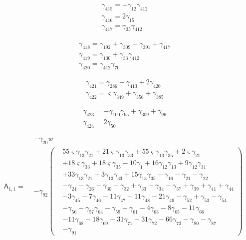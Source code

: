 \[\begin{aligned}\gamma_{415}=- \gamma_{12} \gamma_{412}\\ \gamma_{416}=2 \gamma_{15}\\ \gamma_{417}=\gamma_{35} \gamma_{412}\end{aligned}\]

\[\begin{aligned}\gamma_{418}=\gamma_{192} + \gamma_{309} + \gamma_{391} + \gamma_{417}\\ \gamma_{419}=\gamma_{130} + \gamma_{33} \gamma_{412}\\ \gamma_{420}=\gamma_{412} \gamma_{70}\end{aligned}\]

\[\begin{aligned}\gamma_{421}=\gamma_{286} + \gamma_{413} + 2 \gamma_{420}\\ \gamma_{422}=\varsigma  \gamma_{349} + \gamma_{356} + \gamma_{385}\end{aligned}\]

\[\begin{aligned}\gamma_{423}=- \gamma_{100} \gamma_{95} + \gamma_{309} + \gamma_{96}\\ \gamma_{424}=2 \gamma_{50}\end{aligned}\]

\[\mathsf A_{1,1}=\begin{aligned}&- \gamma_{20} w\\&- \gamma_{92} \left(\begin{aligned}& 55 \varsigma  \gamma_{13} \gamma_{21}+ 21 \varsigma  \gamma_{13} \gamma_{33}+ 55 \varsigma  \gamma_{13} \gamma_{35}+ 2 \varsigma  \gamma_{21}\\&+ 18 \varsigma  \gamma_{33}+ 18 \varsigma  \gamma_{35}- 10 \gamma_{1}+ 16 \gamma_{12} \gamma_{13}+ 9 \gamma_{12} \gamma_{31}\\&+ 33 \gamma_{13} \gamma_{21}+ 3 \gamma_{13} \gamma_{33}+ 15 \gamma_{13} \gamma_{35}- \gamma_{16}- \gamma_{21}- \gamma_{22}\\&- \gamma_{24}- \gamma_{26}- \gamma_{30}- \gamma_{32}+ \gamma_{33}- \gamma_{34}- \gamma_{37}+ \gamma_{39}+ \gamma_{41}+ \gamma_{44}\\&- 3 \gamma_{45}- 7 \gamma_{46}- 11 \gamma_{47}- 11 \gamma_{48}- 21 \gamma_{49}- \gamma_{52}+ \gamma_{53}- \gamma_{54}\\&- \gamma_{56}- \gamma_{57} \gamma_{64}- \gamma_{59}- \gamma_{61}- 4 \gamma_{63}- 8 \gamma_{65}- 11 \gamma_{66}\\&- 11 \gamma_{68}- 18 \gamma_{69}- 31 \gamma_{71}- 31 \gamma_{72}- 66 \gamma_{73}- \gamma_{80}- \gamma_{87}\\&- \gamma_{91}\end{aligned}\right)\end{aligned}\]

